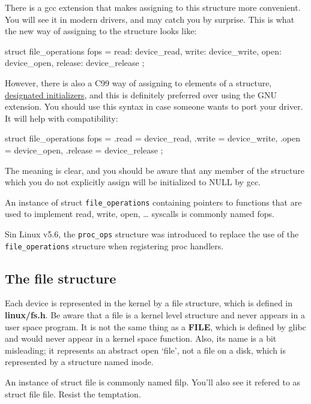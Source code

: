 \documentclass[10pt, oneside]{book}
\begin{document}
There is a gcc extension that makes assigning to this structure more convenient.
You will see it in modern drivers, and may catch you by surprise.
This is what the new way of assigning to the structure looks like:

\begin{code}
struct file_operations fops = {
	read: device_read,
	write: device_write,
	open: device_open,
	release: device_release
};
\end{code}

However, there is also a C99 way of assigning to elements of a structure, \href{https://gcc.gnu.org/onlinedocs/gcc/Designated-Inits.html}{designated initializers}, and this is definitely preferred over using the GNU extension.
You should use this syntax in case someone wants to port your driver.
It will help with compatibility:

\begin{code}
struct file_operations fops = {
	.read = device_read,
	.write = device_write,
	.open = device_open,
	.release = device_release
};
\end{code}

The meaning is clear, and you should be aware that any member of the structure which you do not explicitly assign will be initialized to NULL by gcc.

An instance of struct \verb|file_operations| containing pointers to functions that are used to implement read, write, open, \ldots{} syscalls is commonly named fops.

Sin Linux v5.6, the \verb|proc_ops| structure was introduced to replace the use of the \verb|file_operations| structure when registering proc handlers.

\subsection{The file structure}
\label{sec:file_struct}

Each device is represented in the kernel by a file structure, which is defined in \textbf{linux/fs.h}.
Be aware that a file is a kernel level structure and never appears in a user space program.
It is not the same thing as a \textbf{FILE}, which is defined by glibc and would never appear in a kernel space function.
Also, its name is a bit misleading; it represents an abstract open `file', not a file on a disk, which is represented by a structure named inode.

An instance of struct file is commonly named filp. You'll also see it refered to as struct file file.
Resist the temptation.
\end{document}
